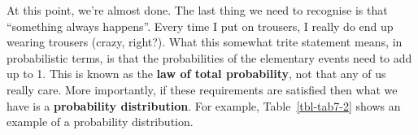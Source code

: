 \documentclass[
  a4paper,
]{book}
\begin{document}
At this point, we're almost done. The last thing we need to recognise is
that ``something always happens''. Every time I put on trousers, I
really do end up wearing trousers (crazy, right?). What this somewhat
trite statement means, in probabilistic terms, is that the probabilities
of the elementary events need to add up to 1. This is known as the
\textbf{law of total probability}, not that any of us really care. More
importantly, if these requirements are satisfied then what we have is a
\textbf{probability distribution}. For example, Table~\ref{tbl-tab7-2}
shows an example of a probability distribution.

\hypertarget{tbl-tab7-2}{}
 
  \providecommand{\huxb}[2]{\arrayrulecolor[RGB]{#1}\global\arrayrulewidth=#2pt}
  \providecommand{\huxvb}[2]{\color[RGB]{#1}\vrule width #2pt}
  \providecommand{\huxtpad}[1]{\rule{0pt}{#1}}
  \providecommand{\huxbpad}[1]{\rule[-#1]{0pt}{#1}}
\end{document}
